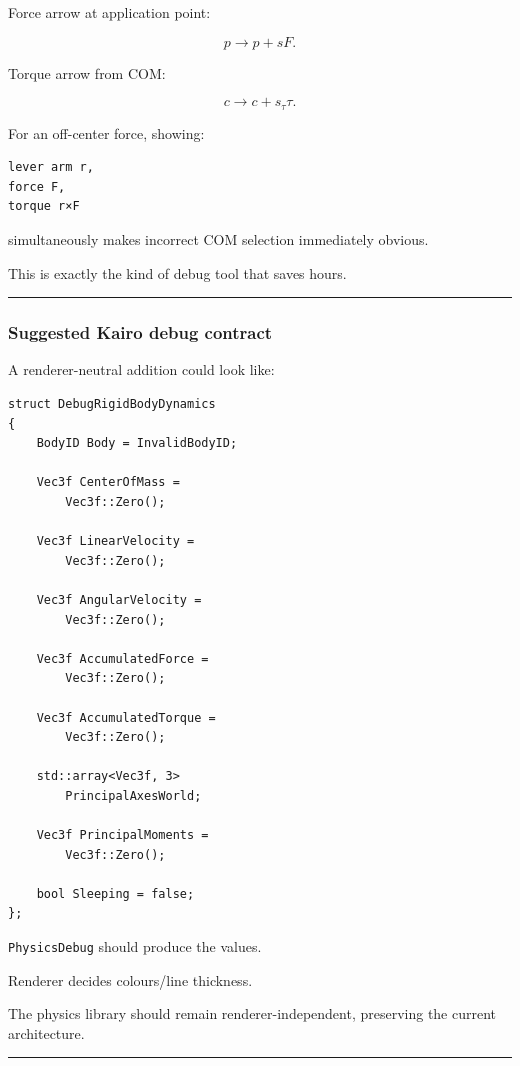 Force arrow at application point:

\[
p\rightarrow p+sF.
\]

Torque arrow from COM:

\[
c\rightarrow c+s_\tau\tau.
\]

For an off-center force, showing:

\begin{verbatim}
lever arm r,
force F,
torque r×F
\end{verbatim}

simultaneously makes incorrect COM selection immediately obvious.

This is exactly the kind of debug tool that saves hours.

\begin{center}\rule{0.5\linewidth}{0.5pt}\end{center}

\subsubsection{Suggested Kairo debug contract}\label{suggested-kairo-debug-contract}

A renderer-neutral addition could look like:

\begin{verbatim}
struct DebugRigidBodyDynamics
{
    BodyID Body = InvalidBodyID;

    Vec3f CenterOfMass =
        Vec3f::Zero();

    Vec3f LinearVelocity =
        Vec3f::Zero();

    Vec3f AngularVelocity =
        Vec3f::Zero();

    Vec3f AccumulatedForce =
        Vec3f::Zero();

    Vec3f AccumulatedTorque =
        Vec3f::Zero();

    std::array<Vec3f, 3>
        PrincipalAxesWorld;

    Vec3f PrincipalMoments =
        Vec3f::Zero();

    bool Sleeping = false;
};
\end{verbatim}

\texttt{PhysicsDebug} should produce the values.

Renderer decides colours/line thickness.

The physics library should remain renderer-independent, preserving the current architecture.

\begin{center}\rule{0.5\linewidth}{0.5pt}\end{center}

